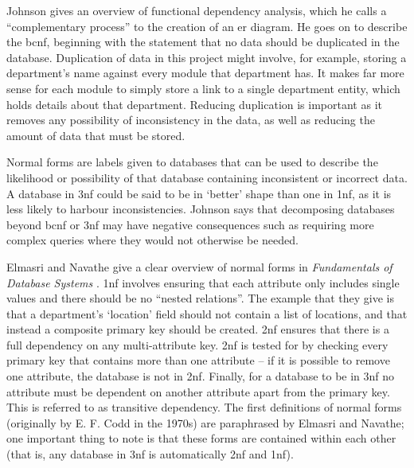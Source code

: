 Johnson gives an overview of functional dependency analysis, which he calls a
``complementary process'' to the creation of an \gls{er} diagram. He goes on
to describe the \gls{bcnf}, beginning with the statement that no data should
be duplicated in the database. Duplication of data in this project might
involve, for example, storing a department's name against every module that
department has. It makes far more sense for each module to simply store a link
to a single department entity, which holds details about that department.
Reducing duplication is important as it removes any possibility of
inconsistency in the data, as well as reducing the amount of data that must be
stored.

Normal forms are labels given to databases that can be used to describe the
likelihood or possibility of that database containing inconsistent or
incorrect data. A database in \gls{3nf} could be said to be in `better' shape
than one in \gls{1nf}, as it is less likely to harbour inconsistencies.
Johnson says that decomposing databases beyond \gls{bcnf} or \gls{3nf} may
have negative consequences such as requiring more complex queries where they
would not otherwise be needed.

Elmasri and Navathe give a clear overview of normal forms in
\emph{Fundamentals of Database Systems} \cite{ElmasriFundamentals_2004}.
\Gls{1nf} involves ensuring that each attribute only includes single values
and there should be no ``nested relations''. The example that they give is
that a department's `location' field should not contain a list of locations,
and that instead a composite primary key should be created. \Gls{2nf} ensures
that there is a full dependency on any multi-attribute key. \Gls{2nf} is
tested for by checking every primary key that contains more than one attribute
-- if it is possible to remove one attribute, the database is not in
\gls{2nf}. Finally, for a database to be in \gls{3nf} no attribute must be
dependent on another attribute apart from the primary key. This is referred to
as transitive dependency. The first definitions of normal forms (originally by
E. F. Codd in the 1970s) are paraphrased by Elmasri and Navathe; one
important thing to note is that these forms are contained within each other
(that is, any database in \gls{3nf} is automatically \gls{2nf} and \gls{1nf}).
